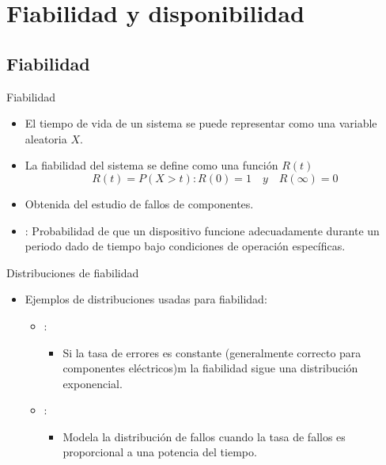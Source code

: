 \section{Fiabilidad y disponibilidad}

\subsection{Fiabilidad}

\begin{frame}[t]{Fiabilidad}
\begin{itemize}
  \item El tiempo de vida de un sistema se puede representar como una variable aleatoria
        $X$.

  \item La fiabilidad del sistema se define como una función $R(t)$
\begin{displaymath}
R(t) = P(X > t) : R(0) = 1 \quad y \quad R(\infty) = 0
\end{displaymath}

  \item Obtenida del estudio de fallos de componentes.

  \item {}:
        Probabilidad de que un dispositivo funcione adecuadamente
        durante un periodo dado de tiempo 
        bajo condiciones de operación específicas.
        
\end{itemize}
\end{frame}

\begin{frame}[t]{Distribuciones de fiabilidad}
\begin{itemize}
  \item Ejemplos de distribuciones usadas para fiabilidad:
    \begin{itemize}
      \item {}:
        \begin{itemize}
          \item Si la tasa de errores es constante 
                (generalmente correcto para componentes eléctricos)m
                la fiabilidad sigue una distribución exponencial.
        \end{itemize}
      \item {}:
        \begin{itemize}
          \item Modela la distribución de fallos cuando la tasa de fallos es
                proporcional a una potencia del tiempo.
        \end{itemize}
    \end{itemize}
\end{itemize}
\end{frame}


